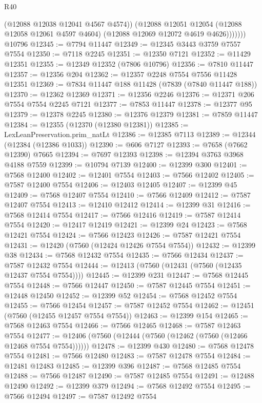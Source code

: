 \begin{lexlean}{R40}
\begin{coremodule}
                (@12088 @12038 @12041 @4567 @4574))
              (@12088
                @12051
                @12054
                (@12088 @12058 @12061 @4597 @4604)
                (@12088 @12069 @12072 @4619 @4626)))))))
    @10796
@12345 := @7794 @11447
@12349 := @12345 @3443 @3759 @7557 @7554
@12350 := @7118 @2245
@12351 := @12350 @7121
@12352 := @11429 @12351
@12355 := @12349 @12352 (@7806 @10796)
@12356 := @7810 @11447
@12357 := @12356 @204
@12362 := @12357 @2248 @7554 @7556 @11428 @12351
@12369 := @7834 @11447 @188 @11428 (@7839 (@7840 @11447 @188))
@12370 := @12362 @12369
@12371 := @12356 @2246
@12376 := @12371 @206 @7554 @7554 @2245 @7121
@12377 := @7853 @11447
@12378 := @12377 @95
@12379 := @12378 @2245
@12380 := @12376 @12379
@12381 := @7859 @11447
@12384 := @12355 (@12370 (@12380 @12381))
@12385 := LexLeanPreservation.prim_natLt
@12386 := @12385 @7113
@12389 := @12344 (@12384 (@12386 @1033))
@12390 := @606 @7127
@12393 := @7658 (@7662 @12390) @7665
@12394 := @7697 @12393
@12398 := @12394 @3763 @3968 @4188 @7559
@12399 := @10794 @7139
@12400 := @12399 @300
@12401 := @7568 @12400
@12402 := @12401 @7554
@12403 := @7566 @12402
@12405 := @7587 @12400 @7554
@12406 := @12403 @12405
@12407 := @12399 @45
@12409 := @7568 @12407 @7554
@12410 := @7566 @12409
@12412 := @7587 @12407 @7554
@12413 := @12410 @12412
@12414 := @12399 @31
@12416 := @7568 @12414 @7554
@12417 := @7566 @12416
@12419 := @7587 @12414 @7554
@12420 := @12417 @12419
@12421 := @12399 @24
@12423 := @7568 @12421 @7554
@12424 := @7566 @12423
@12426 := @7587 @12421 @7554
@12431 := @12420 (@7560 (@12424 @12426 @7554 @7554))
@12432 := @12399 @38
@12434 := @7568 @12432 @7554
@12435 := @7566 @12434
@12437 := @7587 @12432 @7554
@12444 := @12413 (@7560 (@12431 (@7560 (@12435 @12437 @7554 @7554))))
@12445 := @12399 @231
@12447 := @7568 @12445 @7554
@12448 := @7566 @12447
@12450 := @7587 @12445 @7554
@12451 := @12448 @12450
@12452 := @12399 @52
@12454 := @7568 @12452 @7554
@12455 := @7566 @12454
@12457 := @7587 @12452 @7554
@12462 := @12451 (@7560 (@12455 @12457 @7554 @7554))
@12463 := @12399 @154
@12465 := @7568 @12463 @7554
@12466 := @7566 @12465
@12468 := @7587 @12463 @7554
@12477 := @12406 (@7560 (@12444 (@7560 (@12462 (@7560 (@12466 @12468 @7554 @7554))))))
@12478 := @12399 @430
@12480 := @7568 @12478 @7554
@12481 := @7566 @12480
@12483 := @7587 @12478 @7554
@12484 := @12481 @12483
@12485 := @12399 @396
@12487 := @7568 @12485 @7554
@12488 := @7566 @12487
@12490 := @7587 @12485 @7554
@12491 := @12488 @12490
@12492 := @12399 @379
@12494 := @7568 @12492 @7554
@12495 := @7566 @12494
@12497 := @7587 @12492 @7554

\end{coremodule}
\end{lexlean}
